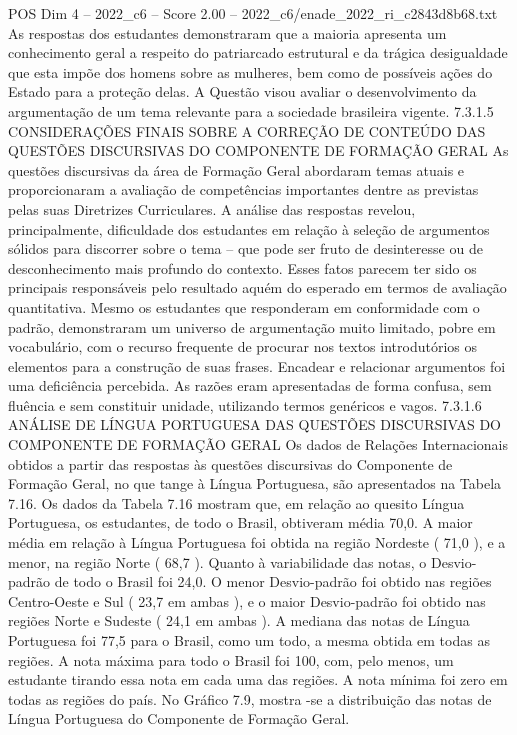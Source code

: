 \begin{textsample}{POS Dim 4 – 2022\_c6 – Score 2.00 – 2022\_c6/enade\_2022\_ri\_c2843d8b68.txt}
As respostas dos estudantes demonstraram que a maioria apresenta um conhecimento geral a respeito do patriarcado estrutural e da trágica desigualdade que esta impõe dos homens sobre as mulheres, bem como de possíveis ações do Estado para a proteção delas.
A Questão visou avaliar o desenvolvimento da argumentação de um tema relevante para a sociedade brasileira vigente. 7.3.1.5 CONSIDERAÇÕES FINAIS SOBRE A CORREÇÃO DE CONTEÚDO DAS QUESTÕES DISCURSIVAS DO COMPONENTE DE FORMAÇÃO GERAL As questões discursivas da área de Formação Geral abordaram temas atuais e proporcionaram a avaliação de competências importantes dentre as previstas pelas suas Diretrizes Curriculares.
A análise das respostas revelou, principalmente, dificuldade dos estudantes em relação à seleção de argumentos sólidos para discorrer sobre o tema – que pode ser fruto de desinteresse ou de desconhecimento mais profundo do contexto.
Esses fatos parecem ter sido os principais responsáveis pelo resultado aquém do esperado em termos de avaliação quantitativa.
Mesmo os estudantes que responderam em conformidade com o padrão, demonstraram um universo de argumentação muito limitado, pobre em vocabulário, com o recurso frequente de procurar nos textos introdutórios os elementos para a construção de suas frases.
Encadear e relacionar argumentos foi uma deficiência percebida.
As razões eram apresentadas de forma confusa, sem fluência e sem constituir unidade, utilizando termos genéricos e vagos. 7.3.1.6 ANÁLISE DE LÍNGUA PORTUGUESA DAS QUESTÕES DISCURSIVAS DO COMPONENTE DE FORMAÇÃO GERAL Os dados de Relações Internacionais obtidos a partir das respostas às questões discursivas do Componente de Formação Geral, no que tange à Língua Portuguesa, são apresentados na Tabela 7.16.
Os dados da Tabela 7.16 mostram que, em relação ao quesito Língua Portuguesa, os estudantes, de todo o Brasil, obtiveram média 70,0.
A maior média em relação à Língua Portuguesa foi obtida na região Nordeste ( 71,0 ), e a menor, na região Norte ( 68,7 ).
Quanto à variabilidade das notas, o Desvio-padrão de todo o Brasil foi 24,0.
O menor Desvio-padrão foi obtido nas regiões Centro-Oeste e Sul ( 23,7 em ambas ), e o maior Desvio-padrão foi obtido nas regiões Norte e Sudeste ( 24,1 em ambas ).
A mediana das notas de Língua Portuguesa foi 77,5 para o Brasil, como um todo, a mesma obtida em todas as regiões.
A nota máxima para todo o Brasil foi 100, com, pelo menos, um estudante tirando essa nota em cada uma das regiões.
A nota mínima foi zero em todas as regiões do país.
No Gráfico 7.9, mostra -se a distribuição das notas de Língua Portuguesa do Componente de Formação Geral.

\end{textsample}
